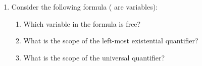 \begin{enumerate}
{}

\item Consider the following formula ( are variables):



	\begin{enumerate}
	 \item Which variable in the formula is free?

	 \item What is the scope of the left-most existential quantifier?

	 \item What is the scope of the universal quantifier?

	\end{enumerate}




  \end{enumerate}
